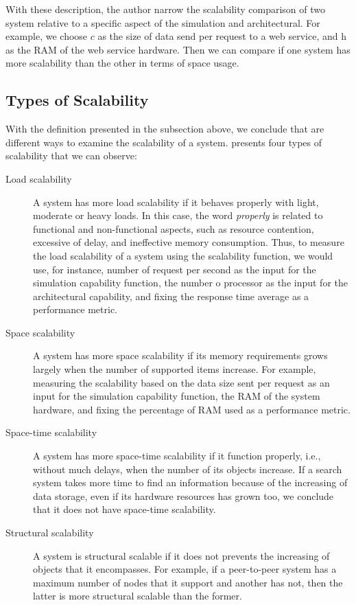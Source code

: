 With these description, the author narrow the scalability comparison of two system relative to a specific aspect of the simulation and architectural. For example, we choose $c$ as the size of data send per request to a web service, and h as the RAM of the web service hardware. Then we can compare if one system has more scalability than the other in terms of space usage. 

\subsection{Types of Scalability}
With the definition presented in the subsection above, we conclude that are different ways to examine the scalability of a system. \cite{BONDI} presents four types of scalability that we can observe:

\begin{description}
\item[Load scalability] A system has more load scalability if it behaves properly with light, moderate or heavy loads. In this case, the word \emph{properly} is related to functional and non-functional aspects, such as resource contention, excessive of delay, and ineffective memory consumption. Thus, to measure the load scalability of a system using the scalability function, we would use, for instance,  number of request per second as the input for the simulation capability function, the number o processor as the input for the architectural capability, and fixing the response time average as a performance metric.
\item[Space scalability]  A system has more space scalability if its memory requirements grows largely when the number of supported items increase. For example, measuring the scalability based on the data size sent per request as an input for the simulation capability function, the RAM of the system hardware, and fixing the percentage of RAM used as a performance metric.
\item[Space-time scalability] A system has more space-time scalability if it function properly, i.e., without much delays, when the number of its objects increase. If a search system takes more time to find an information because of the increasing of data storage, even if its hardware resources has grown too, we conclude that it does not have space-time scalability.
\item[Structural scalability] A system is structural scalable if it does not prevents the increasing of objects that it encompasses. For example, if a peer-to-peer system has a maximum number of nodes that it support and another has not, then the latter is more structural scalable than the former.
\end{description}

